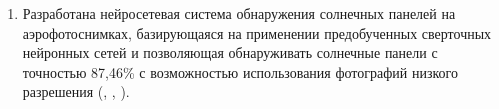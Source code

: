 \begin{enumerate}[wide, labelindent=10mm]
\item Разработана нейросетевая система обнаружения солнечных панелей на аэрофотоснимках, базирующаяся на применении предобученных сверточных нейронных сетей и позволяющая обнаруживать солнечные панели с точностью 87,46\% с возможностью использования фотографий низкого разрешения (\cite{9-A}, \cite{14-A}, \cite{15-A}).




\end{enumerate}
